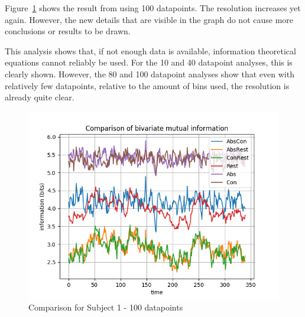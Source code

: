 Figure~\ref{100-trials} shows the result from using 100 datapoints. The resolution increases yet again. However, the new details that are visible in the graph do not cause more conclusions or results to be drawn. 

This analysis shows that, if not enough data is available, information theoretical equations cannot reliably be used. For the 10 and 40 datapoint analyses, this is clearly shown. However, the 80 and 100 datapoint analyses show that even with relatively few datapoints, relative to the amount of bins used, the resolution is already quite clear.

\begin{figure}[!htb]
\caption{Comparison for Subject 1 - 100 datapoints}
\label{100-trials}
    \centering
    \includegraphics[width=\textwidth]{fig/subject1_100trials_all-channel-1}
\end{figure}

